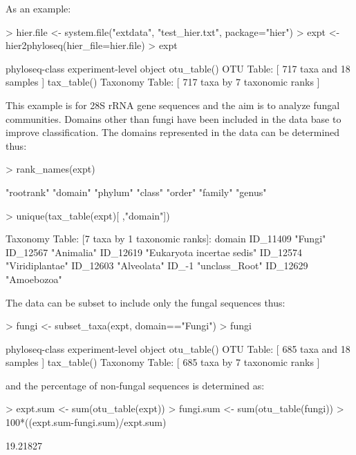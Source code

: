 \documentclass{article}
\begin{document}
As an example:
\begin{Schunk}
\begin{Sinput}
> hier.file <- system.file("extdata", "test_hier.txt", package="hier")
> expt <- hier2phyloseq(hier_file=hier.file)
> expt
\end{Sinput}
\begin{Soutput}
phyloseq-class experiment-level object
otu_table()   OTU Table:         [ 717 taxa and 18 samples ]
tax_table()   Taxonomy Table:    [ 717 taxa by 7 taxonomic ranks ]
\end{Soutput}
\end{Schunk}
This example is for 28S rRNA gene sequences and the aim is to analyze fungal communities.  Domains other than fungi have been included in the data base to improve classification.  The domains represented in the data can be determined thus:
\begin{Schunk}
\begin{Sinput}
> rank_names(expt)
\end{Sinput}
\begin{Soutput}
[1] "rootrank" "domain"   "phylum"   "class"    "order"    "family"   "genus"   
\end{Soutput}
\begin{Sinput}
> unique(tax_table(expt)[ ,"domain"])
\end{Sinput}
\begin{Soutput}
Taxonomy Table:     [7 taxa by 1 taxonomic ranks]:
         domain                    
ID_11409 "Fungi"                   
ID_12567 "Animalia"                
ID_12619 "Eukaryota incertae sedis"
ID_12574 "Viridiplantae"           
ID_12603 "Alveolata"               
ID_-1    "unclass_Root"            
ID_12629 "Amoebozoa"               
\end{Soutput}
\end{Schunk}
The data can be subset to include only the fungal sequences thus:
\begin{Schunk}
\begin{Sinput}
> fungi <- subset_taxa(expt, domain=="Fungi")
> fungi
\end{Sinput}
\begin{Soutput}
phyloseq-class experiment-level object
otu_table()   OTU Table:         [ 685 taxa and 18 samples ]
tax_table()   Taxonomy Table:    [ 685 taxa by 7 taxonomic ranks ]
\end{Soutput}
\end{Schunk}
and the percentage of non-fungal sequences is determined as:
\begin{Schunk}
\begin{Sinput}
> expt.sum <- sum(otu_table(expt))
> fungi.sum <- sum(otu_table(fungi))
> 100*((expt.sum-fungi.sum)/expt.sum)
\end{Sinput}
\begin{Soutput}
[1] 19.21827
\end{Soutput}
\end{Schunk}
\end{document}
